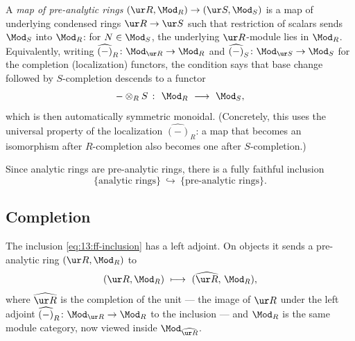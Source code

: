 \begin{definition}[Maps]
\label{def:13:maps}
A \emph{map of pre-analytic rings} $(\ur R,\Mod_R)\to(\ur S,\Mod_S)$ is a map of
underlying condensed rings $\ur R\to\ur S$ such that restriction of scalars sends
$\Mod_S$ into $\Mod_R$: for $N\in\Mod_S$, the underlying $\ur R$-module lies in
$\Mod_R$. Equivalently, writing $\widehat{(-)}_R\colon\Mod_{\ur R}\to\Mod_R$ and
$\widehat{(-)}_S\colon\Mod_{\ur S}\to\Mod_S$ for the completion (localization)
functors, the condition says that base change followed by $S$-completion
descends to a functor
\begin{equation*}
-\otimes_R S\ \colon\ \Mod_R\ \longrightarrow\ \Mod_S,
\end{equation*}
which is then automatically symmetric monoidal. (Concretely, this uses the
universal property of the localization $\widehat{(-)}_R$: a map that becomes an
isomorphism after $R$-completion also becomes one after $S$-completion.)
\end{definition}

Since analytic rings are pre-analytic rings, there is a fully faithful inclusion
\begin{equation}
\label{eq:13:ff-inclusion}
\{\text{analytic rings}\}\ \hookrightarrow\ \{\text{pre-analytic rings}\}.
\end{equation}

\subsection{Completion}

\begin{proposition}
\label{prop:13:completion}
The inclusion \eqref{eq:13:ff-inclusion} has a left adjoint. On objects it sends
a pre-analytic ring $(\ur R, \Mod_R)$ to
\begin{equation*}
(\ur R, \Mod_R)\ \longmapsto\ (\widehat{\ur R},\, \Mod_R),
\end{equation*}
where $\widehat{\ur R}$ is the completion of the unit --- the image of $\ur R$
under the left adjoint $\widehat{(-)}_R\colon\Mod_{\ur R}\to\Mod_R$ to the
inclusion --- and $\Mod_R$ is the same module category, now viewed inside
$\Mod_{\widehat{\ur R}}$.
\end{proposition}

